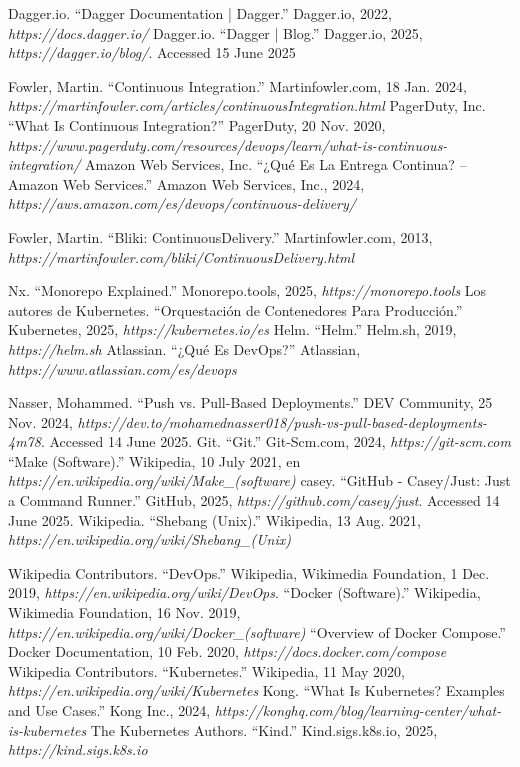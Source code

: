 

\begin{thebibliography}{99}
 Dagger.io. ``Dagger Documentation | Dagger.'' Dagger.io, 2022, {\it https://docs.dagger.io/}
 Dagger.io. “Dagger | Blog.” Dagger.io, 2025, {\it https://dagger.io/blog/}. Accessed 15 June 2025

 Fowler, Martin. ``Continuous Integration.'' Martinfowler.com, 18 Jan. 2024, {\it https://martinfowler.com/articles/continuousIntegration.html}
 PagerDuty, Inc. ``What Is Continuous Integration?'' PagerDuty, 20 Nov. 2020, {\it https://www.pagerduty.com/resources/devops/learn/what-is-continuous-integration/}
 Amazon Web Services, Inc. ``¿Qué Es La Entrega Continua? – Amazon Web Services.'' Amazon Web Services, Inc., 2024, {\it https://aws.amazon.com/es/devops/continuous-delivery/}

 Fowler, Martin. ``Bliki: ContinuousDelivery.'' Martinfowler.com, 2013, {\it https://martinfowler.com/bliki/ContinuousDelivery.html}

 Nx. ``Monorepo Explained.'' Monorepo.tools, 2025, {\it https://monorepo.tools}
 Los autores de Kubernetes. ``Orquestación de Contenedores Para Producción.'' Kubernetes, 2025, {\it https://kubernetes.io/es}
 Helm. ``Helm.'' Helm.sh, 2019, {\it https://helm.sh}
 Atlassian. ``¿Qué Es DevOps?'' Atlassian, {\it https://www.atlassian.com/es/devops}

 Nasser, Mohammed. ``Push vs. Pull-Based Deployments.'' DEV Community, 25 Nov. 2024, {\it https://dev.to/mohamednasser018/push-vs-pull-based-deployments-4m78}. Accessed 14 June 2025.
 Git. ``Git.'' Git-Scm.com, 2024, {\it https://git-scm.com}
 ``Make (Software).'' Wikipedia, 10 July 2021, en {\it https://en.wikipedia.org/wiki/Make\_(software)}
 casey. ``GitHub - Casey/Just: Just a Command Runner.'' GitHub, 2025, {\it https://github.com/casey/just}. Accessed 14 June 2025.
 Wikipedia. ``Shebang (Unix).'' Wikipedia, 13 Aug. 2021, {\it https://en.wikipedia.org/wiki/Shebang\_(Unix)}

 Wikipedia Contributors. ``DevOps.'' Wikipedia, Wikimedia Foundation, 1 Dec. 2019, {\it https://en.wikipedia.org/wiki/DevOps}.
``Docker (Software).'' Wikipedia, Wikimedia Foundation, 16 Nov. 2019, {\it https://en.wikipedia.org/wiki/Docker\_(software)}
 ``Overview of Docker Compose.'' Docker Documentation, 10 Feb. 2020, {\it https://docs.docker.com/compose}
 Wikipedia Contributors. ``Kubernetes.'' Wikipedia, 11 May 2020, {\it https://en.wikipedia.org/wiki/Kubernetes}
 Kong. ``What Is Kubernetes? Examples and Use Cases.'' Kong Inc., 2024, {\it https://konghq.com/blog/learning-center/what-is-kubernetes}
 The Kubernetes Authors. ``Kind.'' Kind.sigs.k8s.io, 2025, {\it https://kind.sigs.k8s.io}



\end{thebibliography}
